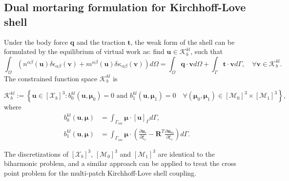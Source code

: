 \documentclass[preprint,12pt]{elsarticle}
\theoremstyle{remark}
\begin{document}
\subsection{Dual mortaring formulation for Kirchhoff-Love shell}

Under the body force $\mathbf{q}$ and the traction $\mathbf{t}$, the weak form of the shell can be formulated by the equilibrium of virtual work as: find $\mathbf{u}\in\mathcal{K}^{kl}_b$, such that
\begin{equation}
    \int_{\Omega}\left(n^{\alpha\beta}(\mathbf{u})\delta\epsilon_{\alpha\beta}(\mathbf{v})+m^{\alpha\beta}(\mathbf{u})\delta\kappa_{\alpha\beta}(\mathbf{v})\right)d\Omega = \int_\Omega\mathbf{q}\cdot\mathbf{v}d\Omega+\int_\Gamma\mathbf{t}\cdot\mathbf{v}d\Gamma,\quad\forall\mathbf{v}\in\mathcal{K}^{kl}_b.
\end{equation}
The constrained function space $\mathcal{K}^{kl}_b$ is

\begin{equation}
    \mathcal{K}^{kl}_b:=\left\{\mathbf{u}\in{}\left[\mathcal{X}_b\right]^3: b^{kl}_0(\mathbf{u}, \boldsymbol{\mu}_0)=0 \text{ and }b^{kl}_1(\mathbf{u}, \boldsymbol{\mu}_1)=0\quad\forall(\boldsymbol{\mu}_0,\boldsymbol{\mu}_1)\in{\left[\mathcal{M}_0\right]^3\times{}\left[\mathcal{M}_1\right]^3}\right\},\label{eq:kl_reduced}
\end{equation}
where
\begin{align}
    b^{kl}_0(\mathbf{u}, \boldsymbol{\mu})&=\int_{\Gamma_{sm}}\boldsymbol{\mu}\cdot\left[\mathbf{u}\right]_{\Gamma}d\Gamma,\\
    b^{kl}_1(\mathbf{u}, \boldsymbol{\mu})&=\int_{\Gamma_{sm}}\boldsymbol{\mu}\cdot\left(\frac{\partial{\mathbf{u}_s}}{\partial\xi_s}-\mathbf{R}^T\frac{\partial{\mathbf{u}_m}}{\partial\xi_s}\right)d\Gamma.
\end{align}

The discretizations of $\left[\mathcal{X}_b\right]^3$, $\left[\mathcal{M}_0\right]^3$ and $\left[\mathcal{M}_1\right]^3$ are identical to the biharmonic problem, and a similar approach can be applied to treat the cross point problem for the multi-patch Kirchhoff-Love shell coupling. \par
\end{document}

